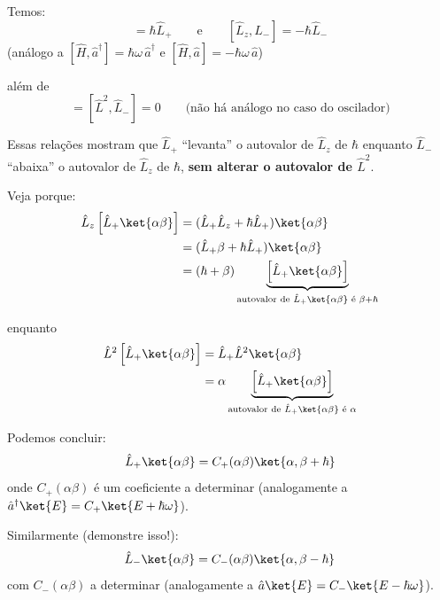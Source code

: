 Temos:
\begin{equation}
    [\hat{L}_z, \hat{L}_+] = \hbar \hat{L}_+ \qquad \text{e} \qquad [\hat{L}_z, \hat{L}_-] = -\hbar \hat{L}_-
\label{eq:aula20_comm_Lz_Lpm}
\end{equation}
(análogo a $[\hat{H}, \hat{a}^\dagger] = \hbar\omega\,\hat{a}^\dagger$ e $[\hat{H}, \hat{a}] = -\hbar\omega\,\hat{a}$)

além de
\begin{equation}
    [\hat{L}^2, \hat{L}_+] = [\hat{L}^2, \hat{L}_-] = 0 \qquad \text{(não há análogo no caso do oscilador)}
\label{eq:aula20_comm_L2_Lpm}
\end{equation}

Essas relações mostram que $\hat{L}_+$ ``levanta'' o autovalor de $\hat{L}_z$ de $\hbar$ enquanto $\hat{L}_-$ ``abaixa'' o autovalor de $\hat{L}_z$ de $\hbar$, \textbf{sem alterar o autovalor de $\hat{L}^2$}.

Veja porque:
\begin{align}
    \hat{L}_z \left[ \hat{L}_+ \ket{\alpha\beta} \right] &= (\hat{L}_+ \hat{L}_z + \hbar \hat{L}_+) \ket{\alpha\beta} \notag \\
    &= (\hat{L}_+ \beta + \hbar \hat{L}_+) \ket{\alpha\beta} \notag \\
    &= (\hbar + \beta) \underbrace{\left[ \hat{L}_+ \ket{\alpha\beta} \right]}_{\text{autovalor de } \hat{L}_+\ket{\alpha\beta} \text{ é } \beta+\hbar}
\label{eq:aula20_Lz_Lplus}
\end{align}

enquanto
\begin{align}
    \hat{L}^2 \left[ \hat{L}_+ \ket{\alpha\beta} \right] &= \hat{L}_+ \hat{L}^2 \ket{\alpha\beta} \notag \\
    &= \alpha \underbrace{\left[ \hat{L}_+ \ket{\alpha\beta} \right]}_{\text{autovalor de } \hat{L}_+\ket{\alpha\beta} \text{ é } \alpha}
\label{eq:aula20_L2_Lplus}
\end{align}

Podemos concluir:
\begin{equation}
    \hat{L}_+ \ket{\alpha\beta} = C_+(\alpha\beta) \ket{\alpha, \beta+\hbar}
\label{eq:aula20_Lplus_acao_geral}
\end{equation}
onde $C_+(\alpha\beta)$ é um coeficiente a determinar (analogamente a $\hat{a}^\dagger \ket{E} = C_+ \ket{E+\hbar\omega}$).

Similarmente (demonstre isso!):
\begin{equation}
    \hat{L}_- \ket{\alpha\beta} = C_-(\alpha\beta) \ket{\alpha, \beta-\hbar}
\label{eq:aula20_Lminus_acao_geral}
\end{equation}
com $C_-(\alpha\beta)$ a determinar (analogamente a $\hat{a}\ket{E} = C_- \ket{E-\hbar\omega}$).

